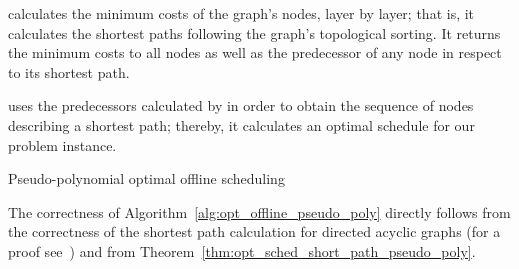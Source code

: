 calculates the minimum costs of the graph's nodes, layer by layer; that is, it calculates the shortest paths following the graph's topological sorting. It returns the minimum costs to all nodes as well as the predecessor of any node in respect to its shortest path.

 uses the predecessors calculated by  in order to obtain the sequence of nodes describing a shortest path; thereby, it calculates an optimal schedule for our problem instance.
\begin{algorithm}[H]
  \caption{Pseudo-polynomial optimal offline scheduling}
  \begin{algorithmic}[1]
	  \State \Return{$\mx$}
  \EndFunction
  \Statex
	\EndFor
		\EndFor
	\EndFor
	\State {}
  \EndFunction
  \Statex
	\EndFor
	\State \Return{$\mx$}
  \EndFunction
  \end{algorithmic}
\label{alg:opt_offline_pseudo_poly}
\end{algorithm}
The correctness of Algorithm~\ref{alg:opt_offline_pseudo_poly} directly follows from the correctness of the shortest path calculation for directed acyclic graphs (for a proof see~\parencite{intro-algo}) and from Theorem~\ref{thm:opt_sched_short_path_pseudo_poly}.

